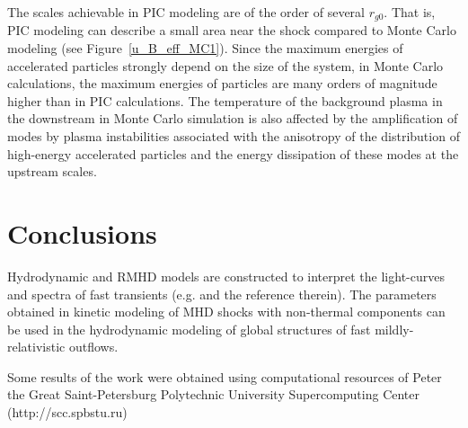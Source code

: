 \documentclass[a4paper]{jpconf}
\begin{document}
The scales achievable in PIC modeling are of the order of several $r_{g0}$. That is, PIC modeling can describe a small area near the shock compared to Monte Carlo modeling (see Figure~\ref{u_B_eff_MC1}). Since the maximum energies of accelerated particles strongly depend on the size of the system, in Monte Carlo calculations, the maximum energies of particles are many orders of magnitude higher than in PIC calculations. The temperature of the background plasma in the downstream in Monte Carlo simulation is also affected by the amplification of modes by plasma instabilities associated with the anisotropy of the distribution of  high-energy accelerated particles and the energy dissipation of these modes at the upstream scales.
	
\section{Conclusions}
Hydrodynamic and RMHD models are constructed to interpret the light-curves and spectra of fast transients (e.g. \citep{1999ApJ...510..379M,2012ApJ...750...68L,2019LRR....23....1M,2020ApJ...903...66L,2021ApJS..256....8U,2022MNRAS.tmp..970G,2022arXiv220108432E} and the reference therein).
The parameters obtained in kinetic modeling of MHD shocks with non-thermal components can be used in the hydrodynamic modeling of  global structures of fast mildly-relativistic outflows.	
	
	
\ack
	Some results of the work were obtained using computational resources of Peter the Great Saint-Petersburg Polytechnic University Supercomputing Center (http://scc.spbstu.ru)
	




% 



%	
	
\end{document}
